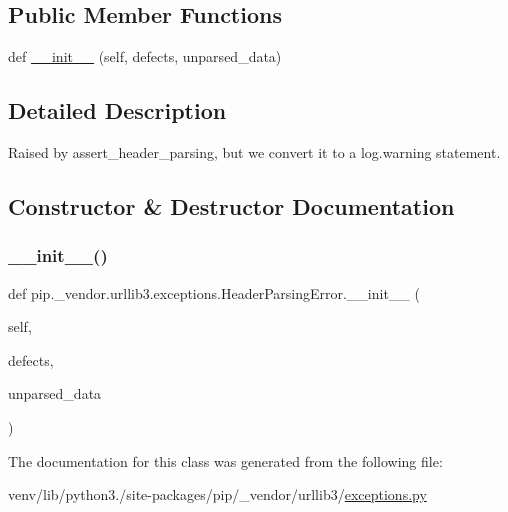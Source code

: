 \subsection*{Public Member Functions}
\begin{DoxyCompactItemize}
\item 
def \hyperlink{classpip_1_1__vendor_1_1urllib3_1_1exceptions_1_1HeaderParsingError_add4e8f48de21602c211d89056cf004e4}{\+\_\+\+\_\+init\+\_\+\+\_\+} (self, defects, unparsed\+\_\+data)
\end{DoxyCompactItemize}


\subsection{Detailed Description}
\begin{DoxyVerb}Raised by assert_header_parsing, but we convert it to a log.warning statement.\end{DoxyVerb}
 

\subsection{Constructor \& Destructor Documentation}
\mbox{\label{classpip_1_1__vendor_1_1urllib3_1_1exceptions_1_1HeaderParsingError_add4e8f48de21602c211d89056cf004e4}} 
\subsubsection{\texorpdfstring{\+\_\+\+\_\+init\+\_\+\+\_\+()}{\_\_init\_\_()}}
{\footnotesize\ttfamily def pip.\+\_\+vendor.\+urllib3.\+exceptions.\+Header\+Parsing\+Error.\+\_\+\+\_\+init\+\_\+\+\_\+ (\begin{DoxyParamCaption}\item[{}]{self,  }\item[{}]{defects,  }\item[{}]{unparsed\+\_\+data }\end{DoxyParamCaption})}



The documentation for this class was generated from the following file\+:\begin{DoxyCompactItemize}
\item 
venv/lib/python3./site-\/packages/pip/\+\_\+vendor/urllib3/\hyperlink{pip_2__vendor_2urllib3_2exceptions_8py}{exceptions.\+py}\end{DoxyCompactItemize}
